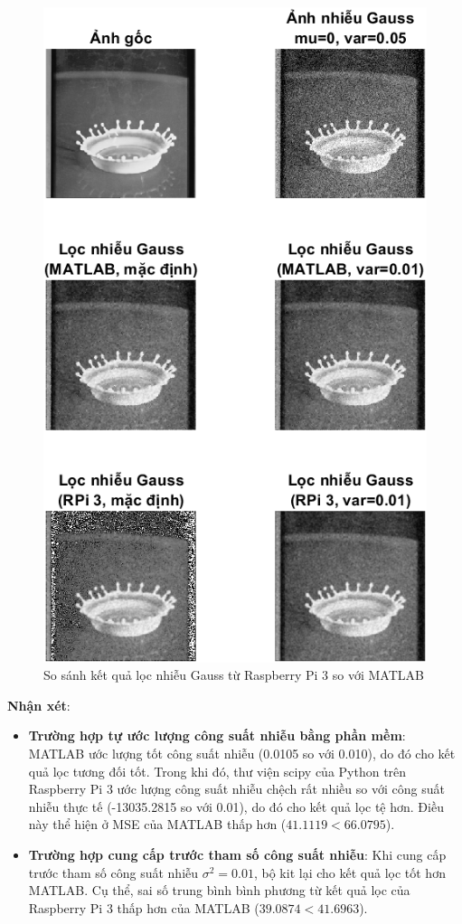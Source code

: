 \begin{figure}[h]
    \centering
    \includegraphics[width=.6\linewidth]{../images/gaussian_compare.png}
    \caption{So sánh kết quả lọc nhiễu Gauss từ Raspberry Pi 3 so với MATLAB}
\end{figure}

\textbf{Nhận xét}: 
\begin{itemize}
    \item \textbf{Trường hợp tự ước lượng công suất nhiễu bằng phần mềm}: 
    MATLAB ước lượng tốt công suất nhiễu (0.0105 so với 0.010), do đó cho kết quả lọc tương đối tốt.
    Trong khi đó, thư viện scipy của Python trên Raspberry Pi 3 ước lượng công suất nhiễu chệch rất nhiều so với công suất nhiễu thực tế (-13035.2815 so với 0.01), do đó cho kết quả lọc tệ hơn.
    Điều này thể hiện ở MSE của MATLAB thấp hơn ($41.1119 < 66.0795$).

    \item \textbf{Trường hợp cung cấp trước tham số công suất nhiễu}:
    Khi cung cấp trước tham số công suất nhiễu $\sigma^2 = 0.01$, bộ kit lại cho kết quả lọc tốt hơn MATLAB.
    Cụ thể, sai số trung bình bình phương từ kết quả lọc của Raspberry Pi 3 thấp hơn của MATLAB ($39.0874 < 41.6963$).
\end{itemize}